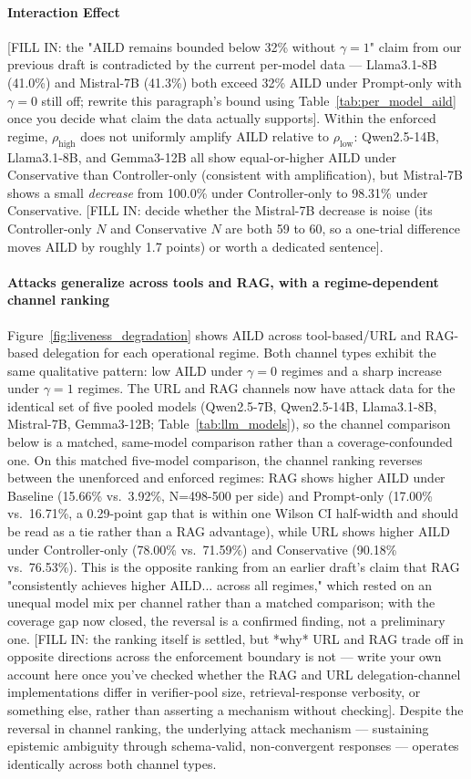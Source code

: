 \documentclass[conference]{IEEEtran}
\begin{document}
\paragraph{Interaction Effect}
[FILL IN: the "AILD remains bounded below 32\% without $\gamma=1$" claim from our previous draft is contradicted by the current per-model data — Llama3.1-8B (41.0\%) and Mistral-7B (41.3\%) both exceed 32\% AILD under Prompt-only with $\gamma=0$ still off; rewrite this paragraph's bound using Table~\ref{tab:per_model_aild} once you decide what claim the data actually supports]. Within the enforced regime, $\rho_{\text{high}}$ does not uniformly amplify AILD relative to $\rho_{\text{low}}$: Qwen2.5-14B, Llama3.1-8B, and Gemma3-12B all show equal-or-higher AILD under Conservative than Controller-only (consistent with amplification), but Mistral-7B shows a small \emph{decrease} from 100.0\% under Controller-only to 98.31\% under Conservative. [FILL IN: decide whether the Mistral-7B decrease is noise (its Controller-only $N$ and Conservative $N$ are both 59 to 60, so a one-trial difference moves AILD by roughly 1.7 points) or worth a dedicated sentence].

\paragraph{Attacks generalize across tools and RAG, with a regime-dependent channel ranking}
Figure~\ref{fig:liveness_degradation} shows AILD across tool-based/URL and RAG-based delegation for each operational regime. Both channel types exhibit the same qualitative pattern: low AILD under $\gamma=0$ regimes and a sharp increase under $\gamma=1$ regimes. The URL and RAG channels now have attack data for the identical set of five pooled models (Qwen2.5-7B, Qwen2.5-14B, Llama3.1-8B, Mistral-7B, Gemma3-12B; Table~\ref{tab:llm_models}), so the channel comparison below is a matched, same-model comparison rather than a coverage-confounded one. On this matched five-model comparison, the channel ranking reverses between the unenforced and enforced regimes: RAG shows higher AILD under Baseline (15.66\% vs.\ 3.92\%, N=498-500 per side) and Prompt-only (17.00\% vs.\ 16.71\%, a 0.29-point gap that is within one Wilson CI half-width and should be read as a tie rather than a RAG advantage), while URL shows higher AILD under Controller-only (78.00\% vs.\ 71.59\%) and Conservative (90.18\% vs.\ 76.53\%). This is the opposite ranking from an earlier draft's claim that RAG "consistently achieves higher AILD... across all regimes," which rested on an unequal model mix per channel rather than a matched comparison; with the coverage gap now closed, the reversal is a confirmed finding, not a preliminary one. [FILL IN: the ranking itself is settled, but *why* URL and RAG trade off in opposite directions across the enforcement boundary is not — write your own account here once you've checked whether the RAG and URL delegation-channel implementations differ in verifier-pool size, retrieval-response verbosity, or something else, rather than asserting a mechanism without checking]. Despite the reversal in channel ranking, the underlying attack mechanism — sustaining epistemic ambiguity through schema-valid, non-convergent responses — operates identically across both channel types.
\end{document}
